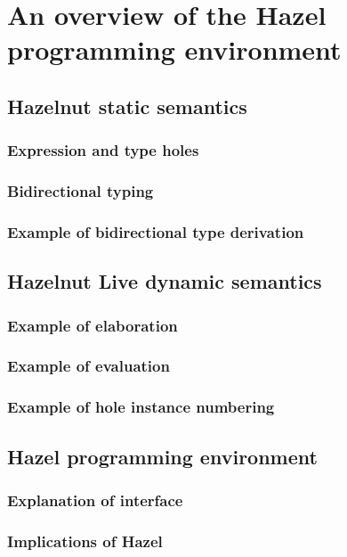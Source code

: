 \section{An overview of the Hazel programming environment}
\label{sec:hazel}

\subsection{Hazelnut static semantics}
\label{sec:statics}

\subsubsection{Expression and type holes}
\label{sec:holes}

\subsubsection{Bidirectional typing}
\label{sec:bidirectional_typing}

\subsubsection{Example of bidirectional type derivation}
\label{sec:typing_example}

\subsection{Hazelnut Live dynamic semantics}
\label{sec:dynamics}

\subsubsection{Example of elaboration}
\label{sec:elaboration_example}

\subsubsection{Example of evaluation}
\label{sec:evaluation_example}

\subsubsection{Example of hole instance numbering}
\label{sec:hole_instance_example}

\subsection{Hazel programming environment}
\label{sec:hazel_online}

\subsubsection{Explanation of interface}
\label{sec:hazel_interface}

\subsubsection{Implications of Hazel}
\label{sec:hazel_implications}


